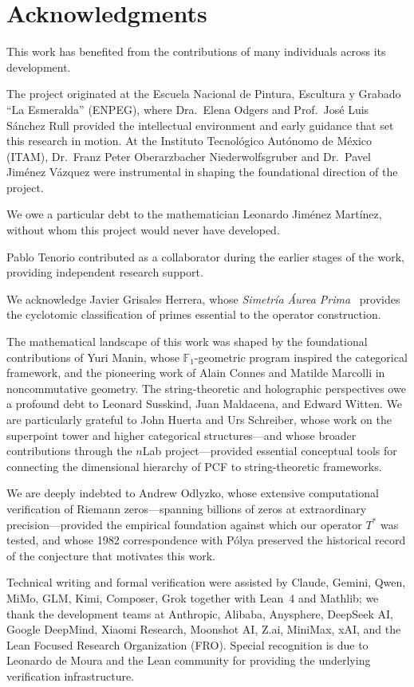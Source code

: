 \section*{Acknowledgments}\label{sec:ack}

This work has benefited from the contributions of many individuals across
its development.

The project originated at the Escuela Nacional de Pintura, Escultura y
Grabado ``La Esmeralda'' (ENPEG), where Dra.\ Elena Odgers and Prof.\
Jos\'e Luis S\'anchez Rull provided the intellectual environment and early
guidance that set this research in motion.  At the Instituto Tecnol\'ogico
Aut\'onomo de M\'exico (ITAM), Dr.\ Franz Peter Oberarzbacher Niederwolfsgruber
and Dr.\ Pavel Jim\'enez V\'azquez were instrumental in shaping the
foundational direction of the project.

We owe a particular debt to the mathematician Leonardo Jim\'enez Mart\'inez,
without whom this project would never have developed.

Pablo Tenorio contributed as a collaborator during the earlier stages of the
work, providing independent research support.

We acknowledge Javier Grisales Herrera, whose
\emph{Simetría Áurea Prima}~\cite{grisales25} provides the cyclotomic
classification of primes essential to the operator construction.

The mathematical landscape of this work was shaped by the foundational
contributions of Yuri Manin, whose $\mathbb{F}_1$-geometric program
inspired the categorical framework, and the pioneering work of Alain Connes
and Matilde Marcolli in noncommutative geometry.  The string-theoretic and
holographic perspectives owe a profound debt to Leonard Susskind, Juan
Maldacena, and Edward Witten.  We are particularly grateful to John Huerta and Urs Schreiber, whose work on the superpoint tower and higher categorical
structures---and whose broader contributions through the $n$Lab
project---provided essential conceptual tools for connecting the
dimensional hierarchy of PCF to string-theoretic frameworks.

We are deeply indebted to Andrew Odlyzko, whose extensive computational verification of Riemann zeros---spanning billions of zeros at extraordinary precision---provided the empirical foundation against which our operator $T^*$ was tested, and whose 1982 correspondence with P\'olya preserved the historical record of the conjecture that motivates this work.

Technical writing and formal verification were assisted by Claude, Gemini, Qwen, MiMo, GLM, Kimi, Composer, Grok together with Lean~4 and Mathlib; we thank the development teams at Anthropic, Alibaba, Anysphere, DeepSeek AI, Google DeepMind, Xiaomi Research, Moonshot AI, Z.ai, MiniMax, xAI, and the Lean Focused Research Organization (FRO). Special recognition is due to Leonardo de Moura and the Lean community for providing the underlying verification infrastructure.

